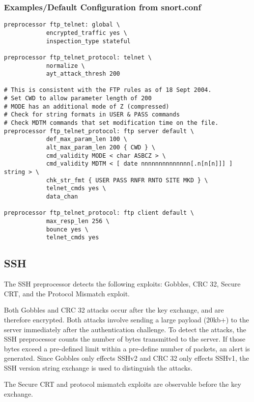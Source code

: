 \documentclass[english]{report}
\begin{document}
\subsubsection{Examples/Default Configuration from snort.conf}

\begin{verbatim}
preprocessor ftp_telnet: global \
            encrypted_traffic yes \
            inspection_type stateful

preprocessor ftp_telnet_protocol: telnet \
            normalize \
            ayt_attack_thresh 200

# This is consistent with the FTP rules as of 18 Sept 2004.
# Set CWD to allow parameter length of 200
# MODE has an additional mode of Z (compressed)
# Check for string formats in USER & PASS commands
# Check MDTM commands that set modification time on the file.
preprocessor ftp_telnet_protocol: ftp server default \
            def_max_param_len 100 \
            alt_max_param_len 200 { CWD } \
            cmd_validity MODE < char ASBCZ > \
            cmd_validity MDTM < [ date nnnnnnnnnnnnnn[.n[n[n]]] ] string > \
            chk_str_fmt { USER PASS RNFR RNTO SITE MKD } \
            telnet_cmds yes \
            data_chan

preprocessor ftp_telnet_protocol: ftp client default \
            max_resp_len 256 \
            bounce yes \
            telnet_cmds yes
\end{verbatim}

\subsection{SSH\label{sub:ssh}}

The SSH preprocessor detects the following exploits: Gobbles, CRC 32, Secure
CRT, and the Protocol Mismatch exploit.

Both Gobbles and CRC 32 attacks occur after the key exchange, and are therefore
encrypted.  Both attacks involve sending a large payload (20kb+) to the server
immediately after the authentication challenge.  To detect the attacks, the SSH
preprocessor counts the number of bytes transmitted to the server.  If those
bytes exceed a pre-defined limit within a pre-define number of packets, an
alert is generated.  Since Gobbles only effects SSHv2 and CRC 32 only effects
SSHv1, the SSH version string exchange is used to distinguish the attacks.

The Secure CRT and protocol mismatch exploits are observable before the key
exchange.
\end{document}
